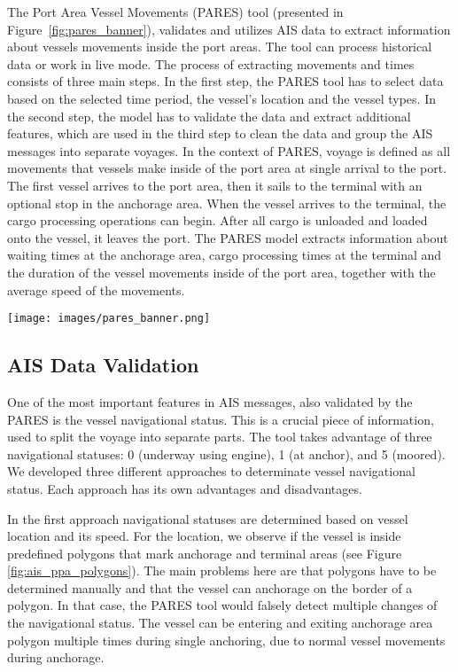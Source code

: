 \documentclass[conference]{IEEEtran}
\begin{document}
The Port Area Vessel Movements (PARES) tool (presented in Figure~\ref{fig:pares_banner}), validates and utilizes AIS data to extract information about vessels movements inside the port areas. The tool can process historical data or work in live mode. The process of extracting movements and times consists of three main steps. In the first step, the PARES tool has to select data based on the selected time period, the vessel's location and the vessel types. In the second step, the model has to validate the data and extract additional features, which are used in the third step to clean the data and group the AIS messages into separate voyages. In the context of PARES, voyage is defined as all movements that vessels make inside of the port area at single arrival to the port. The first vessel arrives to the port area, then it sails to the terminal with an optional stop in the anchorage area. When the vessel arrives to the terminal, the cargo processing operations can begin. After all cargo is unloaded and loaded onto the vessel, it leaves the port. The PARES model extracts information about waiting times at the anchorage area, cargo processing times at the terminal and the duration of the vessel movements inside of the port area, together with the average speed of the movements.

\begin{figure*}[ht!]
    \centering
    \texttt{[image: images/pares\_banner.png]}
    \caption{Port Area Vessel Movements (PARES) tool used for maritime traffic analysis around Port of Piraeus using validated AIS data, depicting vessels captured in the bay area and detailed analysis for a particular vessel.}\label{fig:pares_banner}
\end{figure*}

\subsection{AIS Data Validation}

One of the most important features in AIS messages, also validated by the PARES is the vessel navigational status. This is a crucial piece of information, used to split the voyage into separate parts. The tool takes advantage of three navigational statuses: 0 (underway using engine), 1 (at anchor), and 5 (moored). We developed three different approaches to determinate vessel navigational status. Each approach has its own advantages and disadvantages.

In the first approach navigational statuses are determined based on vessel location and its speed. For the location, we observe if the vessel is inside predefined polygons that mark anchorage and terminal areas (see Figure \ref{fig:ais_ppa_polygons}). The main problems here are that polygons have to be determined manually and that the vessel can anchorage on the border of a polygon. In that case, the PARES tool would falsely detect multiple changes of the navigational status. The vessel can be entering and exiting anchorage area polygon multiple times during single anchoring, due to normal vessel movements during anchorage.
\end{document}
